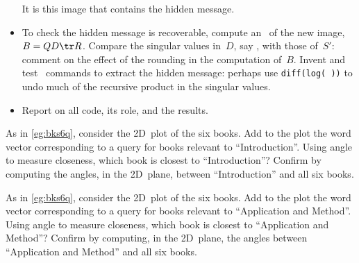\begin{exercise}
\begin{itemize}
It is this image that contains the hidden message.

\item To check the hidden message is recoverable, compute an \svd\ of the new image, \(B=QD\tr R\).
Compare the singular values in~\(D\), say \hlist{}, with those of~\(S'\): comment on the effect of the rounding in the computation of~\(B\).
Invent and test \script\ commands to extract the hidden message: perhaps use \verb|diff(log( ))| to undo much of the recursive product in the singular values.

\item Report on all code, its role, and the results.

\end{itemize}
\end{exercise}





\begin{comment}
Exercises on colour images, perhaps rounding 0-1 images such as fingerprints, also on PCA, LSI, and possibly SSA.
\end{comment}




\begin{exercise} \label{ex:} 
As in \autoref{eg:bks6q}, consider the 2D~plot of the six books. Add to the plot the word vector corresponding to a query for books relevant to ``Introduction''.
Using angle to measure closeness, which book is closest to ``Introduction''?  
Confirm by computing the angles, in the 2D~plane, between ``Introduction'' and all six books.
\end{exercise}



\begin{exercise} \label{ex:} 
As in \autoref{eg:bks6q}, consider the 2D~plot of the six books. Add to the plot the word vector corresponding to a query for books relevant to ``Application and Method''.
Using angle to measure closeness, which book is closest to ``Application and Method''?  
Confirm by computing, in the 2D~plane, the angles between ``Application and Method'' and all six books.
\end{exercise}




